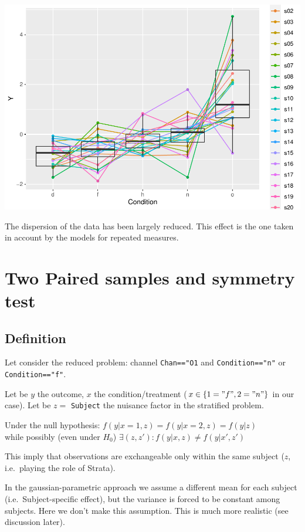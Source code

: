 \documentclass[
]{article}
\begin{document}
\includegraphics{perm_repeated_measures_files/figure-latex/unnamed-chunk-4-1.pdf}

The dispersion of the data has been largely reduced. This effect is the
one taken in account by the models for repeated measures.

\hypertarget{two-paired-samples-and-symmetry-test}{%
\section{Two Paired samples and symmetry
test}\label{two-paired-samples-and-symmetry-test}}

\hypertarget{definition}{%
\subsection{Definition}\label{definition}}

Let consider the reduced problem: channel \texttt{Chan=="O1} and
\texttt{Condition=="n"} or \texttt{Condition=="f"}.

Let be \(y\) the outcome, \(x\) the condition/treatment
(\(x\in \{1="f",2="n"\}\) in our case). Let be \(z=\) \texttt{Subject}
the nuisance factor in the stratified problem.

Under the null hypothesis: \(f(y|x=1,z)=f(y|x=2,z)=f(y|z)\)\\
while possibly (even under \(H_0\))
\(\exists (z,z'): f(y|x,z) \neq f(y|x',z')\)

This imply that observations are exchangeable only within the same
subject (\(z\), i.e.~playing the role of Strata).

In the gaussian-parametric approach we assume a different mean for each
subject (i.e.~Subject-specific effect), but the variance is forced to be
constant among subjects. Here we don't make this assumption. This is
much more realistic (see discussion later).
\end{document}
